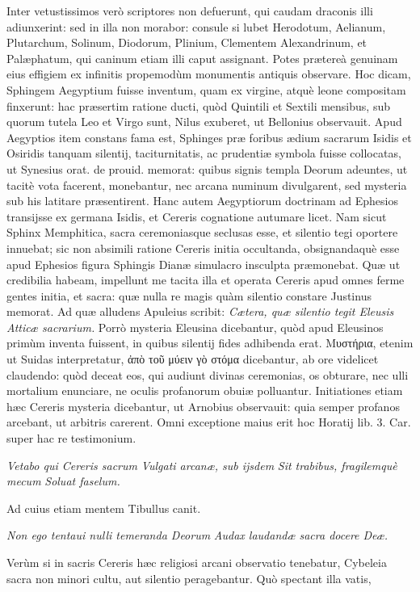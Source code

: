 \documentclass[a4paper, 11pt, oneside, polutonikogreek, latin]{article}
\begin{document}
Inter vetustissimos verò scriptores non defuerunt, qui caudam draconis illi adiunxerint: sed in illa non morabor: consule si lubet Herodotum, Aelianum, Plutarchum, Solinum, Diodorum, Plinium, Clementem Alexandrinum, et Palæphatum, qui caninum etiam illi caput assignant. Potes prætereà genuinam eius effigiem ex infinitis propemodùm monumentis antiquis observare. Hoc dicam, Sphingem Aegyptium fuisse inventum, quam ex virgine, atquè leone compositam finxerunt: hac præsertim ratione ducti, quòd Quintili et Sextili mensibus, sub quorum tutela Leo et Virgo sunt, Nilus exuberet, ut Bellonius observauit. Apud Aegyptios item constans fama est, Sphinges præ foribus ædium sacrarum Isidis et Osiridis tanquam silentij, taciturnitatis, ac prudentiæ symbola fuisse collocatas, ut Synesius orat. de prouid. memorat: quibus signis templa Deorum adeuntes, ut tacitè vota facerent, monebantur, nec arcana numinum divulgarent, sed mysteria sub his latitare præsentirent. Hanc autem Aegyptiorum doctrinam ad Ephesios transijsse ex germana Isidis, et Cereris cognatione autumare licet. Nam sicut Sphinx Memphitica, sacra ceremoniasque seclusas esse, et silentio tegi oportere innuebat; sic non absimili ratione Cereris initia occultanda, obsignandaquè esse apud Ephesios figura Sphingis Dianæ simulacro insculpta præmonebat. Quæ ut credibilia habeam, impellunt me tacita illa et operata Cereris apud omnes ferme gentes initia, et sacra: quæ nulla re magis quàm silentio constare Justinus memorat. Ad quæ alludens Apuleius scribit: \emph{Cætera, quæ silentio tegit Eleusis Atticæ sacrarium.} Porrò mysteria Eleusina dicebantur, quòd apud Eleusinos primùm inventa fuissent, in quibus silentij fides adhibenda erat. Μυστήρια, etenim ut Suidas interpretatur, ἀπὸ τοῦ μύειν 	γὸ στόμα dicebantur, ab ore videlicet claudendo: quòd deceat eos, qui audiunt divinas ceremonias, os obturare, nec ulli mortalium enunciare, ne oculis profanorum obuiæ polluantur. Initiationes etiam hæc Cereris mysteria dicebantur, ut Arnobius observauit: quia semper profanos arcebant, ut arbitris carerent. Omni exceptione maius erit hoc Horatij lib. 3. Car. super hac re testimonium.

\emph{Vetabo qui Cereris sacrum}
\emph{Vulgati arcanæ, sub ijsdem}
\emph{Sit trabibus, fragilemquè mecum}
\emph{Soluat faselum.}

Ad cuius etiam mentem Tibullus canit.

\emph{Non ego tentaui nulli temeranda Deorum}
\emph{Audax laudandæ sacra docere Deæ.}

Verùm si in sacris Cereris hæc religiosi arcani observatio tenebatur, Cybeleia sacra non minori cultu, aut silentio peragebantur. Quò spectant illa vatis,
\end{document}
